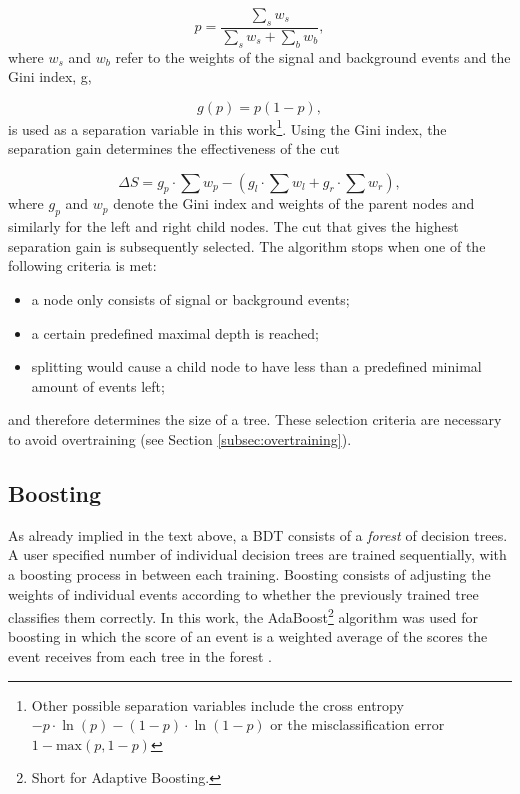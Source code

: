 \begin{equation}
p = \frac{\sum_s w_s}{\sum_s w_s + \sum_b w_b},
\end{equation}
\noindent where $w_s$ and $w_b$ refer to the weights of the signal and background events and the Gini index, g,

\begin{equation}
g(p) = p(1-p), 
\end{equation}
is used as a separation variable in this work\footnote{Other possible separation variables include the cross entropy $-p \cdot \ln(p)-(1-p) \cdot \ln(1-p)$ or the misclassification error $1-\textrm{max}(p,1-p)$}. Using the Gini index, the separation gain determines the effectiveness of the cut

\begin{equation}
\label{eq:separationgain}
\Delta S = g_p \cdot \sum w_p - \left(g_l \cdot \sum w_l + g_r \cdot \sum w_r\right),
\end{equation}
\noindent where $g_p$ and $w_p$ denote the Gini index and weights of the parent nodes and similarly for the left and right child nodes. The cut that gives the highest separation gain is subsequently selected. The algorithm stops when one of the following criteria is met:
\vspace{2mm}

\begin{itemize}
\item a node only consists of signal or background events;
\item a certain predefined maximal depth is reached;
\item splitting would cause a child node to have less than a predefined minimal amount of events left;  
\end{itemize}
\vspace{2mm}
and therefore determines the size of a tree. These selection criteria are necessary to avoid overtraining (see Section \ref{subsec:overtraining}).

\subsection{Boosting}
\label{subsec:boosting}
As already implied in the text above, a BDT consists of a \textit{forest} of decision trees. A user specified number of individual decision trees are trained sequentially, with a boosting process in between each training. Boosting consists of adjusting the weights of individual events according to whether the previously trained tree classifies them correctly. In this work, the AdaBoost\footnote{Short for Adaptive Boosting.} algorithm was used for boosting in which the score of an event is a weighted average of the scores the event receives from each tree in the forest \cite{FREUND1997119}.

